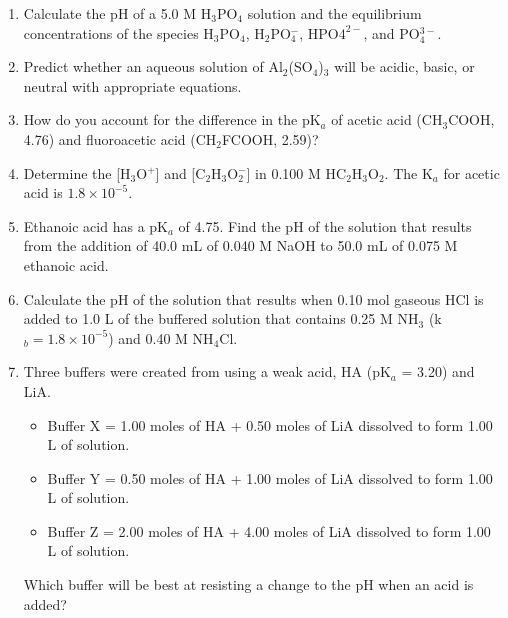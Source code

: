 \documentclass[../chem.tex]{subfiles}
\begin{document}
\begin{enumerate}
    \item Calculate the pH of a 5.0 M H$_3$PO$_4$ solution and the equilibrium concentrations of the species H$_3$PO$_4$, H$_2$PO$_4^-$, HPO$4^{2-}$, and PO$_4^{3-}$.
    \item Predict whether an aqueous solution of Al$_2$(SO$_4$)$_3$ will be acidic, basic, or neutral with appropriate equations.
    \item How do you account for the difference in the pK$_a$ of acetic acid (CH$_3$COOH, 4.76) and fluoroacetic acid (CH$_2$FCOOH, 2.59)?
    \item Determine the [H$_3$O$^+$] and [C$_2$H$_3$O$_2^-$] in 0.100 M HC$_2$H$_3$O$_2$. The K$_a$ for acetic acid is $1.8\times 10^{-5}$.
    \item Ethanoic acid has a pK$_a$ of 4.75. Find the pH of the solution that results from the addition of 40.0 mL of 0.040 M NaOH to 50.0 mL of 0.075 M ethanoic acid.
    \item Calculate the pH of the solution that results when 0.10 mol gaseous HCl is added to 1.0 L of the buffered solution that contains 0.25 M NH$_3$ (k$_b = 1.8\times10^{-5}$) and 0.40 M NH$_4$Cl.
    \item Three buffers were created from using a weak acid, HA (pK$_a$ = 3.20) and LiA.
    \begin{itemize}
        \item Buffer X = 1.00 moles of HA + 0.50 moles of LiA dissolved to form 1.00 L of solution.
        \item Buffer Y = 0.50 moles of HA + 1.00 moles of LiA dissolved to form 1.00 L of solution.
        \item Buffer Z = 2.00 moles of HA + 4.00 moles of LiA dissolved to form 1.00 L of solution.
    \end{itemize}  
    Which buffer will be best at resisting a change to the pH when an acid is added?
\end{enumerate}
\end{document}
